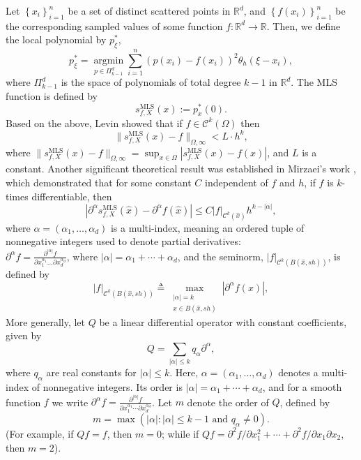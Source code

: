 \documentclass{article}
\newcommand{\dmls}{p^*_\xi}
\newcommand{\mlsfun}[1]{s^\text{MLS}_{f,X}(#1)}
\begin{document}
Let $\left\{x_i\right\}_{i=1}^n $ be a set of distinct scattered points in $\mathbb{R}^d$, and $\left\{f\left(x_i\right)\right\}_{i=1}^n$ be the corresponding sampled values of some function $f: \mathbb{R}^d \rightarrow \mathbb{R}$. Then, we define the local polynomial by $\dmls$, 
      \begin{equation}
      \dmls=\underset{p \in \Pi_{k-1}^d}{\operatorname{argmin}} \sum_{i=1}^n\left(p\left(x_i\right)-f\left(x_i\right)\right)^2 \theta_h\left(\xi-x_i\right),
          \label{dmls}
      \end{equation} 
where $\Pi_{k-1}^d $ is the space of polynomials of total degree $k-1$ in $\mathbb{R}^d$. The MLS function is defined by 
 $$ \mlsfun{x}:=p^*_x(0).$$
Based on the above, Levin \cite{levin1998approximation} showed that if $f\in \mathcal{C}^k(\Omega)$ then      $$\|\mlsfun{x}-f\|_{\Omega, \infty}<L \cdot h^{k},$$
where $\| \mlsfun x -f\|_{\Omega, \infty}=\sup_{x \in \Omega}| \mlsfun x-f(x)|$, and $L$ is a constant.
Another significant theoretical result was established in Mirzaei's work \cite{mirzaei2015analysis}, which demonstrated that for some constant $C$ independent of $f$ and $h$, if $f$ is $k$-times differentiable, then  
$$
\left|\partial^\alpha \mlsfun{\hat{x}}-\partial^\alpha f(\hat{x})\right|\leq C|f|_{\mathcal{C}^k(\hat{x})} h^{k-|\alpha|},
$$
where $\alpha=\left(\alpha_1, \ldots, \alpha_d\right) $ is a multi-index, meaning an ordered tuple of nonnegative integers used to denote partial derivatives:
$ \partial^\alpha f=\frac{\partial^{|\alpha|} f}{\partial x_1^{\alpha_1} \ldots \partial x_d^{\alpha_d}} \text {, where }|\alpha|=\alpha_1+\cdots+\alpha_d$, and the seminorm, $|f|_{\mathcal{C}^k\left(B\left(\hat{x},s h\right)\right)} $, is defined by
$$
|f|_{\mathcal{C}^k\left(B\left(\hat{x},s h\right)\right)} \triangleq \max _{\substack{|\alpha|=k \\ x \in B\left(\hat{x}, s h\right)}}\left|\partial^\alpha f(x)\right|
,$$
More generally, let \( Q \) be a linear differential operator with constant coefficients, given by  
$$Q=\sum_{|\alpha| \leq k} q_\alpha \partial^\alpha,$$
where \( q_\alpha \) are real constants for \( |\alpha| \leq k \). Here, $\alpha=\left(\alpha_1, \ldots, \alpha_d\right)$ denotes a multi-index of nonnegative integers. Its order is $|\alpha|=\alpha_1+\cdots+\alpha_d$, and for a smooth function $f$ we write $\partial^\alpha f=\frac{\partial^{|\alpha|} f}{\partial x_1^{\alpha_1} \cdots \partial x_d^{\alpha_d}}
$.
Let \( m \) denote the order of \( Q \), defined by  
$$m=\max \left(|\alpha|:|\alpha| \leq k-1 \text { and } q_\alpha \neq 0\right).$$
(For example, if \( Q f = f \), then \( m=0 \); while if \( Q f = \partial^2 f / \partial x_1^2+\cdots+\partial^2 f / \partial x_1\partial x_2 \), then \( m=2 \)). 
\end{document}
